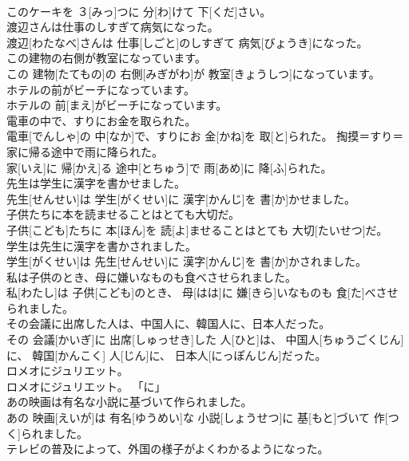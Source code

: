 \documentclass[8pt]{extreport}
\begin{document}
\begin{CJK}{UTF8}{min}
\\	このケーキを ３[みっ]つに 分[わ]けて 下[くだ]さい。	
\\	渡辺さんは仕事のしすぎて病気になった。	
\\	渡辺[わたなべ]さんは 仕事[しごと]のしすぎて 病気[びょうき]になった。	
\\	この建物の右側が教室になっています。	
\\	この 建物[たてもの]の 右側[みぎがわ]が 教室[きょうしつ]になっています。	
\\	ホテルの前がビーチになっています。	
\\	ホテルの 前[まえ]がビーチになっています。	
\\	電車の中で、すりにお金を取られた。	
\\	電車[でんしゃ]の 中[なか]で、すりにお 金[かね]を 取[と]られた。	掏摸＝すり＝ 
\\	家に帰る途中で雨に降られた。	
\\	家[いえ]に 帰[かえ]る 途中[とちゅう]で 雨[あめ]に 降[ふ]られた。	
\\	先生は学生に漢字を書かせました。	
\\	先生[せんせい]は 学生[がくせい]に 漢字[かんじ]を 書[か]かせました。	
\\	子供たちに本を読ませることはとても大切だ。	
\\	子供[こども]たちに 本[ほん]を 読[よ]ませることはとても 大切[たいせつ]だ。	
\\	学生は先生に漢字を書かされました。	
\\	学生[がくせい]は 先生[せんせい]に 漢字[かんじ]を 書[か]かされました。	
\\	私は子供のとき、母に嫌いなものも食べさせられました。	
\\	私[わたし]は 子供[こども]のとき、 母[はは]に 嫌[きら]いなものも 食[た]べさせられました。	
\\	その会議に出席した人は、中国人に、韓国人に、日本人だった。	
\\	その 会議[かいぎ]に 出席[しゅっせき]した 人[ひと]は、 中国人[ちゅうごくじん]に、 韓国[かんこく] 人[じん]に、 日本人[にっぽんじん]だった。	
\\	ロメオにジュリエット。	
\\	ロメオにジュリエット。	「に」
\\	あの映画は有名な小説に基づいて作られました。	
\\	あの 映画[えいが]は 有名[ゆうめい]な 小説[しょうせつ]に 基[もと]づいて 作[つく]られました。	
\\	テレビの普及によって、外国の様子がよくわかるようになった。	

\end{CJK}
\end{document}
